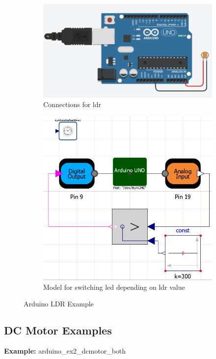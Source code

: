 \documentclass[12pt,a4paper]{report}
\begin{document}
\begin{figure}[H]
\begin{subfigure}{.5\textwidth}
\centering
\includegraphics[width =\linewidth]{3}
\caption{Connections for ldr}
\end{subfigure}
\begin{subfigure}{.5\textwidth}
\centering
\includegraphics[width =\linewidth]{ldr_ex2}
\caption{Model for switching led depending on ldr value}
\end{subfigure}
\caption {Arduino LDR Example}
\label{figure:16}
\end{figure}

\subsection{DC Motor Examples}
\textbf{Example:} arduino\_ex2\_dcmotor\_both\\
\end{document}
